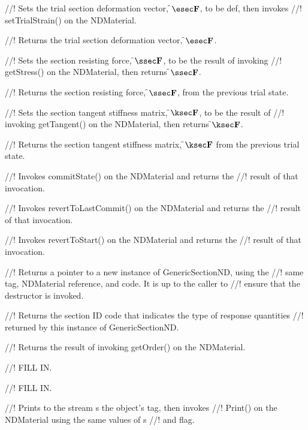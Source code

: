 //! Sets the trial section deformation vector, \f$\esec\f$, to be \p def, then invokes
//! setTrialStrain() on the NDMaterial.

//! Returns the trial section deformation vector, \f$\esec\f$.

//! Sets the section resisting force, \f$\ssec\f$, to be the result of invoking 
//! getStress() on the NDMaterial, then returns \f$\ssec\f$.

//! Returns the section resisting force, \f$\ssec\f$, from the previous trial state.

//! Sets the section tangent stiffness matrix, \f$\ksec\f$, to be the result of
//! invoking getTangent() on the NDMaterial, then returns \f$\ksec\f$.

//! Returns the section tangent stiffness matrix, \f$\ksec\f$ from the previous trial state.

//! Invokes commitState() on the NDMaterial and returns the
//! result of that invocation.

//! Invokes revertToLastCommit() on the NDMaterial and returns the
//! result of that invocation.

//! Invokes revertToStart() on the NDMaterial and returns the
//! result of that invocation.

//! Returns a pointer to a new instance of GenericSectionND, using the
//! same tag, NDMaterial reference, and code. It is up to the caller to
//! ensure that the destructor is invoked.

//! Returns the section ID code that indicates the type of response quantities
//! returned by this instance of GenericSectionND.

//! Returns the result of invoking getOrder() on the NDMaterial.

//! FILL IN.

//! FILL IN.

//! Prints to the stream \p s the object's \p tag, then invokes
//! Print() on the NDMaterial using the same values of \p s
//! and \p flag.
